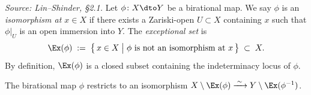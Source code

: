 \begin{definition}
  \label{def:exceptional-set}
  \textit{Source: Lin--Shinder, §2.1.}
  Let \(\phi \colon X \dto Y\) be a birational map.  We say \(\phi\) is an
  \emph{isomorphism at \(x \in X\)} if there exists a Zariski-open \(U \subset X\)
  containing \(x\) such that \(\phi|_U\) is an open immersion into \(Y\).
  The \emph{exceptional set} is
  \[
    \Ex(\phi) \;:=\; \bigl\{\, x \in X \;\big|\; \phi \text{ is not an isomorphism at } x \,\bigr\} \;\subset\; X.
  \]
  By definition, \(\Ex(\phi)\) is a closed subset containing the indeterminacy
  locus of \(\phi\).

  The birational map \(\phi\) restricts to an isomorphism
  \(X \setminus \Ex(\phi) \xrightarrow{\;\sim\;} Y \setminus \Ex(\phi^{-1})\).
\end{definition}

